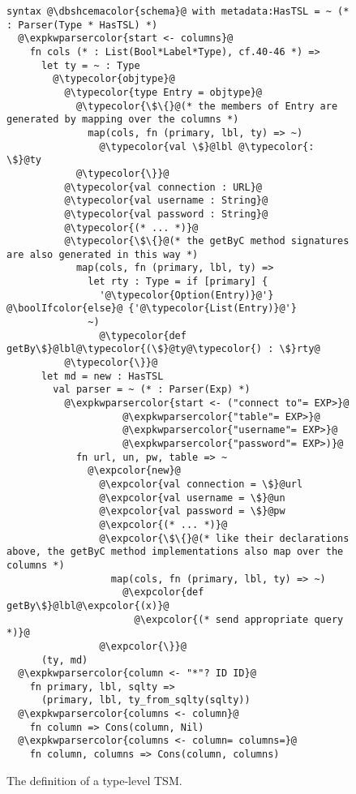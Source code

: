 \documentclass{sig-alternate}
\newcommand{\expkwparsercolor}[1]{\textcolor[HTML]{336699}{#1}}
\newcommand{\expcolor}[1]{\textcolor[HTML]{FF0033}{#1}}
\newcommand{\typecolor}[1]{\textcolor[HTML]{660066}{#1}}
\newcommand{\boolIfcolor}[1]{\textcolor[HTML]{5E0C0C}{#1}}
\newcommand{\dbshcemacolor}[1]{\textcolor[HTML]{5AC3D1}{#1}}
\newcommand{\mycaption}[1]{\vspace{-4px}\caption{#1}\vspace{-2px}}
\begin{document}
\begin{figure}[t]
\begin{lstlisting}[style=wyvern]
syntax @\dbshcemacolor{schema}@ with metadata:HasTSL = ~ (* : Parser(Type * HasTSL) *)
  @\expkwparsercolor{start <- columns}@
    fn cols (* : List(Bool*Label*Type), cf.40-46 *) =>
      let ty = ~ : Type
        @\typecolor{objtype}@
          @\typecolor{type Entry = objtype}@
            @\typecolor{\$\{}@(* the members of Entry are generated by mapping over the columns *)
              map(cols, fn (primary, lbl, ty) => ~)
                @\typecolor{val \$}@lbl @\typecolor{:  \$}@ty
            @\typecolor{\}}@
          @\typecolor{val connection : URL}@
          @\typecolor{val username : String}@
          @\typecolor{val password : String}@
          @\typecolor{(* ... *)}@
          @\typecolor{\$\{}@(* the getByC method signatures are also generated in this way *) 
            map(cols, fn (primary, lbl, ty) => 
              let rty : Type = if [primary] {
                '@\typecolor{Option(Entry)}@'} @\boolIfcolor{else}@ {'@\typecolor{List(Entry)}@'}
              ~)
                @\typecolor{def getBy\$}@lbl@\typecolor{(\$}@ty@\typecolor{) : \$}rty@
          @\typecolor{\}}@
      let md = new : HasTSL
        val parser = ~ (* : Parser(Exp) *)
          @\expkwparsercolor{start <- ("connect to"= EXP>}@
                    @\expkwparsercolor{"table"= EXP>}@
                    @\expkwparsercolor{"username"= EXP>}@
                    @\expkwparsercolor{"password"= EXP>)}@
            fn url, un, pw, table => ~
              @\expcolor{new}@ 
                @\expcolor{val connection = \$}@url
                @\expcolor{val username = \$}@un
                @\expcolor{val password = \$}@pw
                @\expcolor{(* ... *)}@
                @\expcolor{\$\{}@(* like their declarations above, the getByC method implementations also map over the columns *)
                  map(cols, fn (primary, lbl, ty) => ~)
                    @\expcolor{def getBy\$}@lbl@\expcolor{(x)}@ 
                      @\expcolor{(* send appropriate query *)}@
                @\expcolor{\}}@
      (ty, md)
  @\expkwparsercolor{column <- "*"? ID ID}@
    fn primary, lbl, sqlty => 
      (primary, lbl, ty_from_sqlty(sqlty))
  @\expkwparsercolor{columns <- column}@
    fn column => Cons(column, Nil)
  @\expkwparsercolor{columns <- column= columns=}@
    fn column, columns => Cons(column, columns)
\end{lstlisting}
\mycaption{The definition of a type-level TSM.}
\label{typekw-example-1}
\end{figure}
\end{document}
